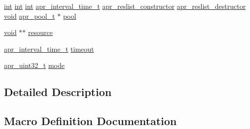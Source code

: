 \begin{DoxyCompactItemize}
\item 
\hyperlink{pcre_8txt_a42dfa4ff673c82d8efe7144098fbc198}{int} \hyperlink{pcre_8txt_a42dfa4ff673c82d8efe7144098fbc198}{int} \hyperlink{pcre_8txt_a42dfa4ff673c82d8efe7144098fbc198}{int} \hyperlink{group__apr__time_gaae2129185a395cc393f76fabf4f43e47}{apr\+\_\+interval\+\_\+time\+\_\+t} \hyperlink{group__APR__Util__RL_ga57065208a6925b61f5ca96ade452a3d6}{apr\+\_\+reslist\+\_\+constructor} \hyperlink{group__APR__Util__RL_gab642eccd03379810b6beb1e7bf009dad}{apr\+\_\+reslist\+\_\+destructor} \hyperlink{group__MOD__ISAPI_gacd6cdbf73df3d9eed42fa493d9b621a6}{void} \hyperlink{structapr__pool__t}{apr\+\_\+pool\+\_\+t} $\ast$ \hyperlink{group__APR__Util__RL_gacf6798552feb00325fcde6cf23b1ebee}{pool}
\item 
\hyperlink{group__MOD__ISAPI_gacd6cdbf73df3d9eed42fa493d9b621a6}{void} $\ast$$\ast$ \hyperlink{group__APR__Util__RL_gaa6244aacafcc4ec1d0727bdb32614b11}{resource}
\item 
\hyperlink{group__apr__time_gaae2129185a395cc393f76fabf4f43e47}{apr\+\_\+interval\+\_\+time\+\_\+t} \hyperlink{group__APR__Util__RL_ga9ceb71d3d9fcd18962d16e49bef6153a}{timeout}
\item 
\hyperlink{group__apr__platform_ga558548a135d8a816c4787250744ea147}{apr\+\_\+uint32\+\_\+t} \hyperlink{group__APR__Util__RL_ga22a1aa1b710da89106f72460a06a6b5d}{mode}
\end{DoxyCompactItemize}


\subsection{Detailed Description}


\subsection{Macro Definition Documentation}
